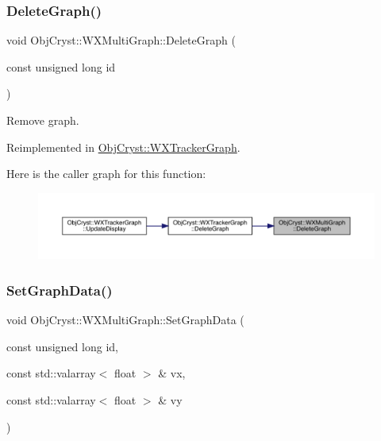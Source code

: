 \subsubsection{\texorpdfstring{DeleteGraph()}{DeleteGraph()}}
{\footnotesize\ttfamily void Obj\+Cryst\+::\+W\+X\+Multi\+Graph\+::\+Delete\+Graph (\begin{DoxyParamCaption}\item[{const unsigned long}]{id }\end{DoxyParamCaption})\hspace{0.3cm}{\ttfamily [virtual]}}

Remove graph. 

Reimplemented in \mbox{\hyperlink{class_obj_cryst_1_1_w_x_tracker_graph_af36c19c220ac18f46ff11954ed695686}{Obj\+Cryst\+::\+W\+X\+Tracker\+Graph}}.

Here is the caller graph for this function\+:
\nopagebreak
\begin{figure}[H]
\begin{center}
\leavevmode
\includegraphics[width=350pt]{class_obj_cryst_1_1_w_x_multi_graph_aeeea3497b22a397a5a521322698c3166_icgraph}
\end{center}
\end{figure}
\mbox{\label{class_obj_cryst_1_1_w_x_multi_graph_a09c95e65cdf98714bb4dedcbe4fec310}} 
\subsubsection{\texorpdfstring{SetGraphData()}{SetGraphData()}}
{\footnotesize\ttfamily void Obj\+Cryst\+::\+W\+X\+Multi\+Graph\+::\+Set\+Graph\+Data (\begin{DoxyParamCaption}\item[{const unsigned long}]{id,  }\item[{const std\+::valarray$<$ float $>$ \&}]{vx,  }\item[{const std\+::valarray$<$ float $>$ \&}]{vy }\end{DoxyParamCaption})}

